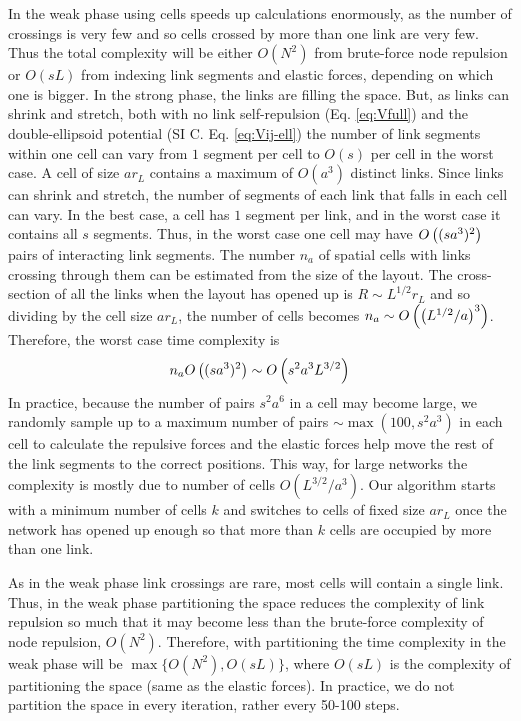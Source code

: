 \documentclass[endfloats,nofootinbib,preprint,floatfix,titlepage,superscriptaddress,linenumbers]{revtex4-1} %
\begin{document}
{In the weak phase using cells speeds up calculations enormously, as the number of crossings is very few and so cells crossed by more than one link are very few. 
Thus the total complexity will be either $O(N^2)$ from brute-force node repulsion or $O(sL)$ from indexing link segments and elastic forces, depending on which one is bigger.
In the strong phase, the links are filling the space.
But, as links can shrink and stretch, both with no link self-repulsion (Eq. \eqref{eq:Vfull}) and the double-ellipsoid potential (SI C. Eq. \eqref{eq:Vij-ell}) the number of link segments within one cell can vary from $1$ segment per cell to $O(s)$ per cell in the worst case.
A cell of size $ar_L$ contains a maximum of $O(a^3)$ distinct links. 
Since links can shrink and stretch, the number of segments of each link that falls in each cell can vary. 
In the best case, a cell has $1$ segment per link, and in the worst case it contains all $s$ segments.
Thus, in the worst case one cell may have $O\left((sa^3)^2\right)$ pairs of interacting link segments. 
The number $n_a$ of spatial cells with links crossing through them can be estimated from the size of the layout. 
The cross-section of all the links when the layout has opened up is $R\sim L^{1/2} r_L$ and so dividing by the cell size $ar_L$, the number of cells becomes $n_a \sim O\left(\left(L^{1/2}/a\right)^3\right)$. 
Therefore, the worst case time complexity is 
\[n_a O\left((sa^3)^2\right) \sim  O\left({ s^2 a^3  L^{3/2} } \right) \]
In practice, because the number of pairs $s^2 a^6$ in a cell may become large, we randomly sample up to a maximum number of pairs $\sim \max (100, s^2 a^3)$ in each cell to calculate the repulsive forces and the elastic forces help move the rest of the link segments to the correct positions. 
This way, for large networks the complexity is mostly due to number of cells $O(L^{3/2}/a^3)$.
Our algorithm starts with a minimum number of cells $k$ and switches to cells of fixed size $ar_L$ once the network has opened up enough so that more than $k$ cells are occupied by more than one link. 

As in the weak phase link crossings are rare, most cells will contain a single link.
Thus, in the weak phase partitioning the space reduces the complexity of link repulsion so much that it may become less than the brute-force complexity of node repulsion, $O(N^2)$.
Therefore,  with partitioning the time complexity in the weak phase will be $\max\{O(N^2),O(sL)\}$, where $O(sL)$ is the complexity of partitioning the space (same as the elastic forces).
In practice, we do not partition the space in every iteration, rather every 50-100 steps. 

}
\end{document}
